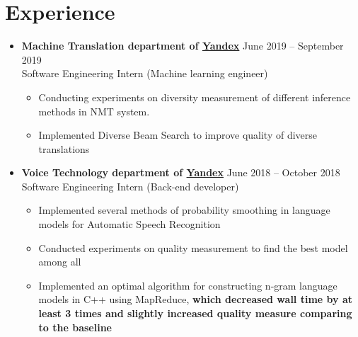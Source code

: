 \documentclass[letterpaper,11pt]{article}
\newcommand{\resumeSubHeadingListStart}{\begin{itemize}[leftmargin=*]}
\newcommand{\resumeSubHeadingListEnd}{\end{itemize}}
\begin{document}
\vspace{-13pt}
\section{Experience}
  \resumeSubHeadingListStart
      \item{
        \textbf{Machine Translation department of \href{https://yandex.com/company/}{\color{blue} Yandex}}
        \hfill
        June 2019 -- September 2019 \\
        Software Engineering Intern (Machine learning engineer)
      }
      \vspace{-6pt}
      \begin{itemize}
        \item Conducting experiments on diversity measurement of different inference methods in NMT system.
        \vspace{-4pt}
        \item Implemented Diverse Beam Search to improve quality of diverse translations
      \end{itemize}
	  \vspace{-10pt}
      \item{
        \textbf{Voice Technology department of \href{https://yandex.com/company/}{\color{blue} Yandex}}
        \hfill
        June 2018 -- October 2018 \\
        Software Engineering Intern (Back-end developer)
      }
      \vspace{-6pt}
      \begin{itemize}
        \item Implemented several methods of probability smoothing in language models for Automatic Speech Recognition
        \vspace{-2pt}
        \item Conducted experiments on quality measurement to find the best model among all
		\vspace{-2pt}        
        \item Implemented an optimal algorithm for constructing n-gram language models in C++ using MapReduce, \textbf{which decreased wall time by at least 3 times and slightly increased quality measure comparing to the baseline}
      \end{itemize}
  \resumeSubHeadingListEnd

\vspace{-23pt}
\end{document}
